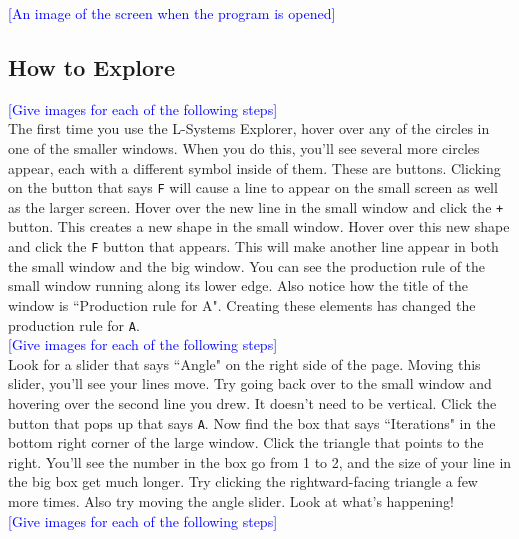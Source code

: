 \documentclass[12pt,twoside]{reedthesis}
\newcommand{\code}[1]{\texttt{#1}}
\begin{document}
	\textcolor{blue}{[An image of the screen when the program is opened]}
	
\subsection{How to Explore}
	
	
	\textcolor{blue}{[Give images for each of the following steps]}\\
	
	The first time you use the L-Systems Explorer, hover over any of the circles in one of the smaller windows. When you do this, you'll see several more circles appear, each with a different symbol inside of them. These are buttons. Clicking on the button that says \code{F} will cause a line to appear on the small screen as well as the larger screen. Hover over the new line in the small window and click the \code{+} button. This creates a new shape in the small window. Hover over this new shape and click the \code{F} button that appears. This will make another line appear in both the small window and the big window. You can see the production rule of the small window running along its lower edge. Also notice how the title of the window is ``Production rule for A". Creating these elements has changed the production rule for \code{A}.\\
	
	\textcolor{blue}{[Give images for each of the following steps]}\\
	
	Look for a slider that says ``Angle" on the right side of the page. Moving this slider, you'll see your lines move. Try going back over to the small window and hovering over the second line you drew. It doesn't need to be vertical. Click the button that pops up that says \code{A}. Now find the box that says ``Iterations" in the bottom right corner of the large window. Click the triangle that points to the right. You'll see the number in the box go from 1 to 2, and the size of your line in the big box get much longer. Try clicking the rightward-facing triangle a few more times. Also try moving the angle slider. Look at what's happening!\\
	
	\textcolor{blue}{[Give images for each of the following steps]}\\
	
\end{document}
